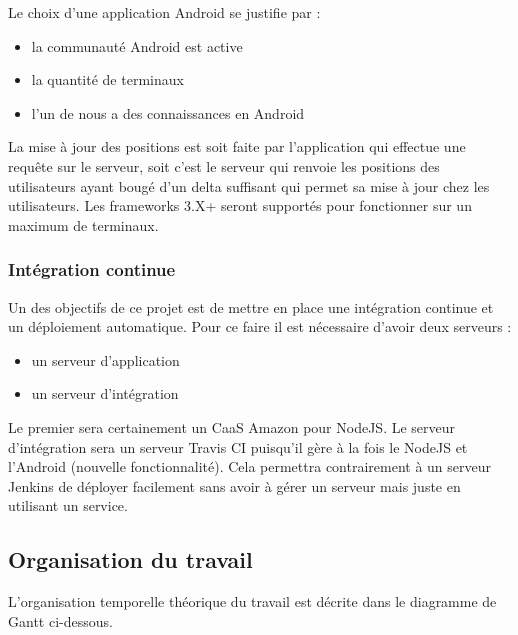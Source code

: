 Le choix d'une application Android se justifie par :
\begin{itemize}
    \item la communauté Android est active
    \item la quantité de terminaux
    \item l'un de nous a des connaissances en Android
\end{itemize}
La mise à jour des positions est soit faite par l'application qui effectue une requête sur le serveur, soit c'est le serveur qui renvoie les positions des utilisateurs ayant bougé d'un delta suffisant qui permet sa mise à jour chez les utilisateurs. Les frameworks 3.X+ seront supportés pour fonctionner sur un maximum de terminaux.


\subsubsection{Intégration continue}
Un des objectifs de ce projet est de mettre en place une intégration continue et un déploiement automatique. Pour ce faire il est nécessaire d'avoir deux serveurs :
\begin{itemize}
    \item un serveur d'application
    \item un serveur d'intégration
\end{itemize}

Le premier sera certainement un CaaS Amazon pour NodeJS. Le serveur d'intégration sera un serveur Travis CI puisqu'il gère à la fois le NodeJS et l'Android (nouvelle fonctionnalité). Cela permettra contrairement à un serveur Jenkins de déployer facilement sans avoir à gérer un serveur mais juste en utilisant un service.

\subsection{Organisation du travail}

L'organisation temporelle théorique du travail est décrite dans le diagramme de Gantt ci-dessous.

